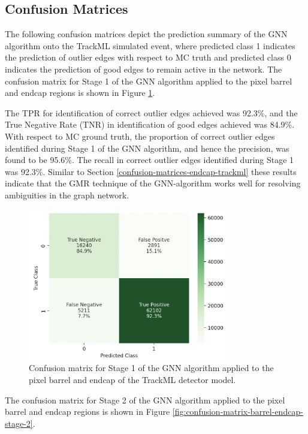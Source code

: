 \subsection{Confusion Matrices}

The following confusion matrices depict the prediction summary of the GNN algorithm onto the TrackML simulated event, where predicted class 1 indicates the prediction of outlier edges with respect to MC truth and predicted class 0 indicates the prediction of good edges to remain active in the network. The confusion matrix for Stage 1 of the GNN algorithm applied to the pixel barrel and endcap regions is shown in Figure \ref{fig:confusion-matrix-barrel-endcap-stage-1}.


The TPR for identification of correct outlier edges achieved was 92.3\%, and the True Negative Rate (TNR) in identification of good edges achieved was 84.9\%. With respect to MC ground truth, the proportion of correct outlier edges identified during Stage 1 of the GNN algorithm, and hence the precision, was found to be 95.6\%. The recall in correct outlier edges identified during Stage 1 was 92.3\%. Similar to Section \ref{confusion-matrices-endcap-trackml} these results indicate that the GMR technique of the GNN-algorithm works well for resolving ambiguities in the graph network.

\begin{figure}[htbp]
    \centering
    \includegraphics[width=0.79\textwidth]{images/7-results/confusion_matrix_barrel_stage_1.png}
    \caption{Confusion matrix for Stage 1 of the GNN algorithm applied to the pixel barrel and endcap of the TrackML detector model.}
    \label{fig:confusion-matrix-barrel-endcap-stage-1}%
\end{figure}

The confusion matrix for Stage 2 of the GNN algorithm applied to the pixel barrel and endcap regions is shown in Figure \ref{fig:confusion-matrix-barrel-endcap-stage-2}.


